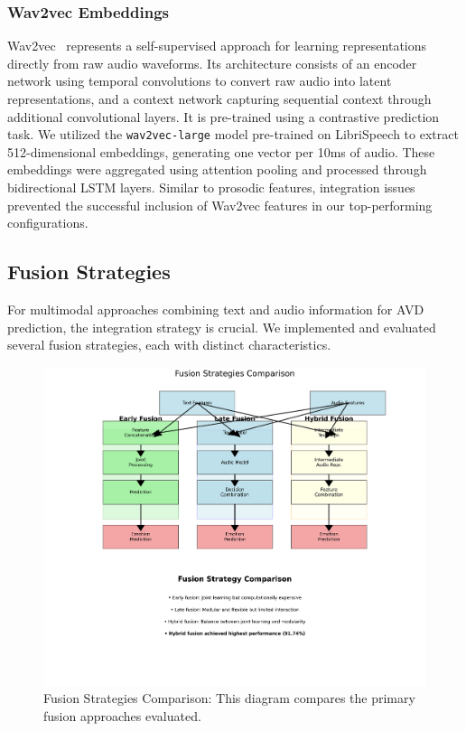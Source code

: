 \documentclass[12pt]{article}
\begin{document}
\subsubsection{Wav2vec Embeddings}
Wav2vec~\cite{schneider2019wav2vec} represents a self-supervised approach for learning representations directly from raw audio waveforms. Its architecture consists of an encoder network using temporal convolutions to convert raw audio into latent representations, and a context network capturing sequential context through additional convolutional layers. It is pre-trained using a contrastive prediction task. We utilized the \texttt{wav2vec-large} model pre-trained on LibriSpeech to extract 512-dimensional embeddings, generating one vector per 10ms of audio. These embeddings were aggregated using attention pooling and processed through bidirectional LSTM layers. Similar to prosodic features, integration issues prevented the successful inclusion of Wav2vec features in our top-performing configurations.

\subsection{Fusion Strategies}
\label{subsec:fusion}
For multimodal approaches combining text and audio information for AVD prediction, the integration strategy is crucial. We implemented and evaluated several fusion strategies, each with distinct characteristics.

\begin{figure}[h]
    \centering
    \includegraphics[width=0.9\linewidth]{Figures/fusion_strategies_comparison.png}
    \caption{Fusion Strategies Comparison: This diagram compares the primary fusion approaches evaluated.}
    \label{fig:fusion_strategies}
\end{figure}
\end{document}
